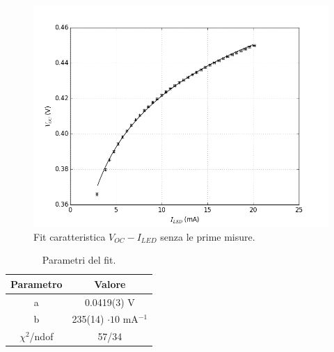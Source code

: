 \documentclass[journal, a4paper]{IEEEtran}
\begin{document}
\begin{figure}[htp]
\centering
\includegraphics[scale=.4]{hm4_2}
\caption{Fit caratteristica $V_{OC}-I_{LED}$ senza le prime misure.}
\label{fig:hm4_2}
\end{figure}

\begin{table}[htp]
\centering
\caption{Parametri del fit.}
\label{tab:fit2}
\begin{tabular}{|c|c|}
\hline 
Parametro & Valore \\ 
\hline 
a & 0.0419(3) V \\ 
\hline 
b & 235(14) $\cdot 10$ mA$^{-1}$ \\ 
\hline 
$\chi^2$/ndof & 57/34 \\ 
\hline 
\end{tabular} 
\end{table}
\end{document}
